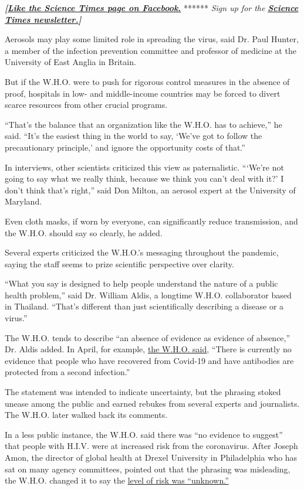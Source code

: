 \textbf{\emph{{[}}\href{http://on.fb.me/1paTQ1h}{\emph{Like the Science
Times page on Facebook.}}} ****** \emph{\textbar{} Sign up for the}
\textbf{\href{http://nyti.ms/1MbHaRU}{\emph{Science Times
newsletter.}}\emph{{]}}}

Aerosols may play some limited role in spreading the virus, said Dr.
Paul Hunter, a member of the infection prevention committee and
professor of medicine at the University of East Anglia in Britain.

But if the W.H.O. were to push for rigorous control measures in the
absence of proof, hospitals in low- and middle-income countries may be
forced to divert scarce resources from other crucial programs.

``That's the balance that an organization like the W.H.O. has to
achieve,'' he said. ``It's the easiest thing in the world to say, `We've
got to follow the precautionary principle,' and ignore the opportunity
costs of that.''

In interviews, other scientists criticized this view as paternalistic.
```We're not going to say what we really think, because we think you
can't deal with it?' I don't think that's right,'' said Don Milton, an
aerosol expert at the University of Maryland.

Even cloth masks, if worn by everyone, can significantly reduce
transmission, and the W.H.O. should say so clearly, he added.

Several experts criticized the W.H.O.'s messaging throughout the
pandemic, saying the staff seems to prize scientific perspective over
clarity.

``What you say is designed to help people understand the nature of a
public health problem,'' said Dr. William Aldis, a longtime W.H.O.
collaborator based in Thailand. ``That's different than just
scientifically describing a disease or a virus.''

The W.H.O. tends to describe ``an absence of evidence as evidence of
absence,'' Dr. Aldis added. In April, for example,
\href{https://www.reuters.com/article/us-health-coronavirus-who-idUSKCN2270FB}{the
W.H.O. said}, ``There is currently no evidence that people who have
recovered from Covid-19 and have antibodies are protected from a second
infection.''

The statement was intended to indicate uncertainty, but the phrasing
stoked unease among the public and earned rebukes from several experts
and journalists. The W.H.O. later walked back its comments.

In a less public instance, the W.H.O. said there was ``no evidence to
suggest'' that people with H.I.V. were at increased risk from the
coronavirus. After Joseph Amon, the director of global health at Drexel
University in Philadelphia who has sat on many agency committees,
pointed out that the phrasing was misleading, the W.H.O. changed it to
say the
\href{https://www.who.int/emergencies/diseases/novel-coronavirus-2019/question-and-answers-hub/q-a-detail/q-a-on-covid-19-hiv-and-antiretrovirals}{level
of risk was ``unknown.''}

